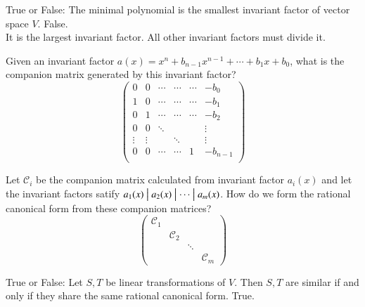 \documentclass[avery5371,grid]{flashcards}
\newcommand{\divides}{\bigm|}
\begin{document}
\begin{flashcard}{True or False: The minimal polynomial is the smallest invariant factor of vector space $V$.}
 False.\\
 
 It is the largest invariant factor. All other invariant factors must divide it.
\end{flashcard}

\begin{flashcard}{Given an invariant factor $a(x) = x^n + b_{n-1}x^{n-1} + \cdots + b_1 x + b_0$, what is the companion matrix generated by this invariant factor?}
 $$ \left ( 
 \begin{array}{cccccc}
      0 & 0 & \cdots & \cdots & \cdots & -b_0 \\
      1 & 0 & \cdots & \cdots & \cdots & -b_1 \\
      0 & 1 & \cdots & \cdots & \cdots & -b_2 \\
      0 & 0 & \ddots &&& \vdots \\
      \vdots & \vdots &&\ddots&& \vdots \\
      0 & 0 & \cdots & \cdots & 1 & -b_{n-1} \\
 \end{array}
 \right)$$
\end{flashcard}

\begin{flashcard}{Let $\mathcal{C}_i$ be the companion matrix calculated from invariant factor $a_i(x)$ and let the invariant factors satify $a_1(x) \divides a_2(x) \divides \cdots \divides a_m(x)$. How do we form the rational canonical form from these companion matrices? }
 $$ \left ( 
 \begin{array}{cccc}
      \mathcal{C}_1 &&& \\
      & \mathcal{C}_2 && \\
      && \ddots & \\
      &&& \mathcal{C}_m
 \end{array}
 \right)$$
\end{flashcard}

\begin{flashcard}{True or False: Let $S,T$ be linear transformations of $V$. Then $S,T$ are similar if and only if they share the same rational canonical form.}
 True.
\end{flashcard}
\end{document}
